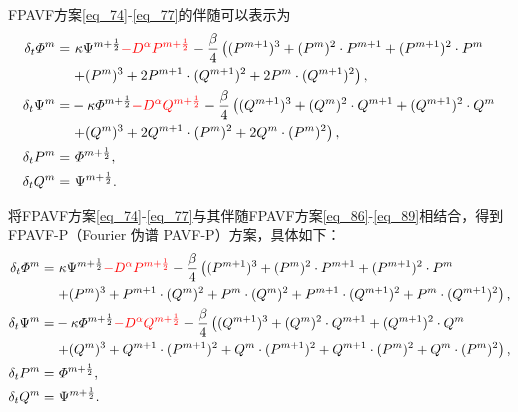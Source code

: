 FPAVF方案\eqref{eq_74}-\eqref{eq_77}的伴随可以表示为
\begin{align}
\delta_{t} \varPhi^{m}=&~\kappa \Psi^{m+\frac{1}{2}}\textcolor[rgb]{1.00,0.00,0.00}{-D^{\alpha} P^{m+\frac{1}{2}}}-\frac{\beta}{4}\left( (P^{m+1})^3+ (P^{m})^{2}\cdot P^{m+1}+(P^{m+1})^{2}\cdot P^{m}\right.\nonumber\\
	&\left.+ (P^{m})^{3}+2 P^{m+1}\cdot (Q^{m+1})^{2}+2 P^{m}\cdot (Q^{m+1})^{2}\right),\label{eq_86}\\
\delta_{t} \Psi^{m}=&-\kappa \varPhi^{m+\frac{1}{2}}\textcolor[rgb]{1.00,0.00,0.00}{-D^{\alpha} Q^{m+\frac{1}{2}}}-\frac{\beta}{4}\left( (Q^{m+1})^3+ (Q^{m})^{2}\cdot Q^{m+1}+ (Q^{m+1})^{2}\cdot Q^{m}\right.\nonumber\\
	&\left.+ (Q^{m})^{3}+2 Q^{m+1}\cdot (P^{m})^{2}+2 Q^{m}\cdot (P^{m})^{2}\right),\label{eq_87}\\
\delta_{t} P^{m}=&~\varPhi^{m+\frac{1}{2}},\label{eq_88}\\
\delta_{t} Q^{m}=&~\Psi^{m+\frac{1}{2}}.\label{eq_89}
\end{align}

将FPAVF方案\eqref{eq_74}-\eqref{eq_77}与其伴随FPAVF方案\eqref{eq_86}-\eqref{eq_89}相结合，得到FPAVF-P（Fourier 伪谱 PAVF-P）方案，具体如下：
\begin{align}
\delta_{t} \varPhi^{m}=&~\kappa \Psi^{m+\frac{1}{2}}\textcolor[rgb]{1.00,0.00,0.00}{-D^{\alpha} P^{m+\frac{1}{2}}}-\frac{\beta}{4}\left((P^{m+1})^3+(P^{m})^{2}\cdot P^{m+1}+(P^{m+1})^{2}\cdot P^{m}\right.\nonumber\\
	&\left.+(P^{m})^{3}+P^{m+1}\cdot (Q^{m})^{2}+P^{m}\cdot (Q^{m})^{2}+P^{m+1}\cdot (Q^{m+1})^{2}+P^{m}\cdot (Q^{m+1})^{2}\right),\label{eq_98}\\
\delta_{t} \Psi^{m}=&-\kappa \varPhi^{m+\frac{1}{2}}\textcolor[rgb]{1.00,0.00,0.00}{-D^{\alpha} Q^{m+\frac{1}{2}}}-\frac{\beta}{4}\left((Q^{m+1})^3+(Q^{m})^{2}\cdot Q^{m+1}+(Q^{m+1})^{2}\cdot Q^{m}\right.\nonumber\\
	&\left.+(Q^{m})^{3}+Q^{m+1}\cdot (P^{m+1})^{2}+Q^{m}\cdot (P^{m+1})^{2}+Q^{m+1}\cdot (P^{m})^{2}+Q^{m}\cdot (P^{m})^{2}\right),\label{eq_99}\\
\delta_{t} P^{m}=&~\varPhi^{m+\frac{1}{2}},\label{eq_100}\\
\delta_{t} Q^{m}=&~\Psi^{m+\frac{1}{2}}.\label{eq_101}
\end{align}

